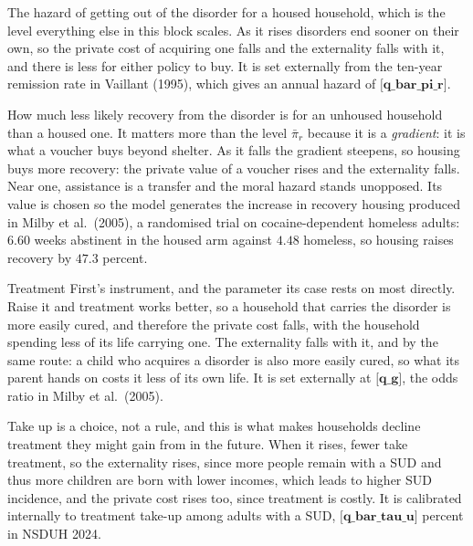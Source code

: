 \documentclass[10pt]{article}
\begin{document}
\begin{description}\setlength{\itemsep}{0.25em}\setlength{\parskip}{0em}
\item[$\bar\pi_r$, the baseline SUD recovery rate.] The hazard of getting out of the
disorder for a housed household, which is the level everything else in this block
scales. As it rises disorders end sooner on their own, so the private
cost of acquiring one falls and the externality falls with it, and there is less for
either policy to buy. It is set externally from the ten-year remission rate in Vaillant (1995), which gives an annual hazard of
$\textbf{[q_bar_pi_r]}$.
\item[$\mu_H$, SUD recovery when homeless.] How much less likely recovery from the
disorder is for an unhoused household than a housed one. It matters more than the
level $\bar\pi_r$ because it is a \emph{gradient}: it is what a voucher buys beyond
shelter. As it falls the gradient steepens, so housing buys more
recovery: the private value of a voucher rises and the externality falls. Near one, assistance is a transfer and the
moral hazard stands unopposed. Its value is chosen so the model generates the
increase in recovery housing produced in Milby et al.\ (2005), a randomised trial on
cocaine-dependent homeless adults: $6.60$ weeks abstinent in the housed arm against
$4.48$ homeless, so housing raises recovery by $47.3$ percent.
\item[$g$, the treatment effect on recovery.] Treatment First's instrument, and the
parameter its case rests on most directly. Raise it and treatment works
better, so a household that carries the disorder is more easily cured, and
therefore the private cost falls, with the household spending less of its
life carrying one. The
externality falls with it, and by the same route: a child who acquires a disorder is
also more easily cured, so what its parent hands on costs it less of its own life. It is set externally at $\textbf{[q_g]}$, the
odds ratio in Milby et al.\ (2005).
\item[$\bar\tau^{u}$, the utility cost of treatment.] Take up is a choice, not a
rule, and this is what makes households decline treatment they might gain
from in the future. When it rises, fewer take treatment, so the externality rises, since
more people remain with a SUD and thus more children are born with lower
incomes, which leads to higher SUD incidence, and the private cost rises too, since
treatment is costly. It is calibrated internally to treatment take-up among adults
with a SUD, $\textbf{[q_bar_tau_u]}$ percent in NSDUH 2024.
\end{description}
\end{document}
